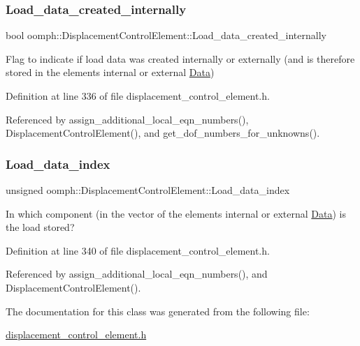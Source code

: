 \subsubsection{\texorpdfstring{Load\+\_\+data\+\_\+created\+\_\+internally}{Load\_data\_created\_internally}}
{\footnotesize\ttfamily bool oomph\+::\+Displacement\+Control\+Element\+::\+Load\+\_\+data\+\_\+created\+\_\+internally\hspace{0.3cm}{\ttfamily [protected]}}



Flag to indicate if load data was created internally or externally (and is therefore stored in the element\textquotesingle{}s internal or external \hyperlink{classoomph_1_1Data}{Data}) 



Definition at line 336 of file displacement\+\_\+control\+\_\+element.\+h.



Referenced by assign\+\_\+additional\+\_\+local\+\_\+eqn\+\_\+numbers(), Displacement\+Control\+Element(), and get\+\_\+dof\+\_\+numbers\+\_\+for\+\_\+unknowns().

\mbox{\label{classoomph_1_1DisplacementControlElement_a9837d5e0ce72dfb0a05d3f93b0a54ee0}} 
\subsubsection{\texorpdfstring{Load\+\_\+data\+\_\+index}{Load\_data\_index}}
{\footnotesize\ttfamily unsigned oomph\+::\+Displacement\+Control\+Element\+::\+Load\+\_\+data\+\_\+index\hspace{0.3cm}{\ttfamily [protected]}}



In which component (in the vector of the element\textquotesingle{}s internal or external \hyperlink{classoomph_1_1Data}{Data}) is the load stored? 



Definition at line 340 of file displacement\+\_\+control\+\_\+element.\+h.



Referenced by assign\+\_\+additional\+\_\+local\+\_\+eqn\+\_\+numbers(), and Displacement\+Control\+Element().



The documentation for this class was generated from the following file\+:\begin{DoxyCompactItemize}
\item 
\hyperlink{displacement__control__element_8h}{displacement\+\_\+control\+\_\+element.\+h}\end{DoxyCompactItemize}
